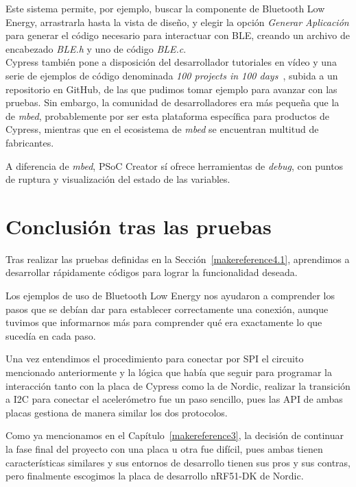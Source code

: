 Este sistema permite, por ejemplo, buscar la componente de Bluetooth Low Energy, arrastrarla hasta la vista de diseño, y elegir la opción \textit{Generar Aplicación} para generar el código necesario para interactuar con BLE, creando un archivo de encabezado \textit{BLE.h} y uno de código \textit{BLE.c}.\\

Cypress también pone a disposición del desarrollador tutoriales en vídeo y una serie de ejemplos de código denominada \textit{100 projects in 100 days}~\cite{100Projects}, subida a un repositorio en GitHub, de las que pudimos tomar ejemplo para avanzar con las pruebas.
Sin embargo, la comunidad de desarrolladores era más pequeña que la de \emph{mbed}, probablemente por ser esta plataforma específica para productos de Cypress, mientras que en el ecosistema de \emph{mbed} se encuentran multitud de fabricantes.

A diferencia de \emph{mbed}, PSoC Creator sí ofrece herramientas de \textit{debug}, con puntos de ruptura y visualización del estado de las variables.

\section{Conclusión tras las pruebas}
\label{makereference4.3}

Tras realizar las pruebas definidas en la Sección~\ref{makereference4.1}, aprendimos a desarrollar rápidamente códigos para lograr la funcionalidad deseada. 

Los ejemplos de uso de Bluetooth Low Energy nos ayudaron a comprender los pasos que se debían dar para establecer correctamente una conexión, aunque tuvimos que informarnos más para comprender qué era exactamente lo que sucedía en cada paso.

Una vez entendimos el procedimiento para conectar por SPI el circuito mencionado anteriormente y la lógica que había que seguir para programar la interacción tanto con la placa de Cypress como la de Nordic, realizar la transición a I2C para conectar el acelerómetro fue un paso sencillo, pues las API de ambas placas gestiona de manera similar los dos protocolos.

Como ya mencionamos en el Capítulo~\ref{makereference3}, la decisión de continuar la fase final del proyecto con una placa u otra fue difícil, pues ambas tienen características similares y sus entornos de desarrollo tienen sus pros y sus contras, pero finalmente escogimos la placa de desarrollo nRF51-DK de Nordic. %